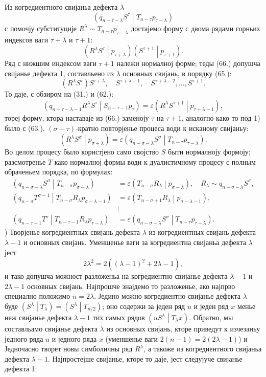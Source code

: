 ﻿\documentclass[11pt]{article}
\newcommand{\pair}[2]{\left(#1\middle|#2\right)}
\newcommand{\eps}{\varepsilon}
\begin{document}
Из когредиентного свијаньа дефекта $\lambda$
\[
 \pair{q_{n-\tau-\lambda}S^\tau}{T_{n-\tau}p_{\tau-\lambda}}
\]
с помочју субституције $R^\lambda\sim T_{n-\tau}p_{\tau-\lambda}$ достајемо форму с двома рядами горньих индексов ваги $\tau+\lambda$ и $\tau+1$:
\begin{equation}
 \pair{R^\lambda S^\tau}{p_{\tau+\lambda}}\pair{S^{\tau+1}}{p_{\tau+1}}.
\tag{66}
\end{equation}
Ряд с нижшим индексом ваги $\tau+1$ належи нормалној форме; теды (66.) допушча свијанье дефекта 1, составльено из $\lambda$ основных свијань, в порядку (65.):
\[
 (R^\lambda S^\tau)S^{\tau+\lambda},\quad S^{\tau+\lambda-1},\quad S^{\tau+\lambda-2},\ldots,S^{\tau+1}.
\]
То даје, с обзиром на (31.) и (62.):
\[
 \pair{q_{n-\tau-\lambda-1}R^\lambda S^\tau}{S_{n-\tau-1}p_\tau}
 =\eps\pair{R^\lambda S^{\tau+1}}{p_{\tau+\lambda+1}},
\]
тореј форму, ктора наставаје из (66.) заменоју $\tau$ на $\tau+1$, аналогно како то под 1) было с (63.). $(\sigma-\tau)$-кратно повторјенье процеса води к исканому свијаньу:
\[
 \pair{R^\lambda S^\sigma}{p_{\sigma+\lambda}}
 =\eps\pair{q_{n-\sigma-\lambda}S^\sigma}{T_{n-\tau}p_{\tau-\lambda}}.
\]
Во целом процесу было користјено само својство $S$ быти нормалноју формоју; разсмотренье $T$ како нормалној формы води к дуалистичному процесу с полным обраченьем порядка, по формулах:
\begin{align*}
\pair{q_{n-\sigma-\lambda}S^\sigma}{T_{n-\sigma}p_{\sigma-\lambda}}&=\eps\pair{T_{n-\sigma}R_\lambda}{p_{\sigma-\lambda}},\quad R_\lambda\sim q_{n-\sigma-\lambda}S^\sigma,\\
\pair{q_{n-\sigma}T^{\sigma-1}}{T_{n-\sigma}R_\lambda p_{\sigma-\lambda-1}}&=\eps\pair{T_{n-\sigma+1}R_\lambda}{p_{\sigma-\lambda-1}},\\
&\vdots\\
\pair{q_{n-\tau-1}T^\tau}{T_{n-\tau-1}R_\lambda p_{\tau-\lambda}}&=\eps\pair{q_{n-\sigma-\lambda}S^\sigma}{T_{n-\tau}p_{\tau-\lambda}}.
\end{align*}
) Творјенье когредиентных свијань дефекта $\lambda$ из когредиентных свијань дефекта $\lambda-1$ и основных свијань. Уменшенье ваги за когредиентна свијаньа дефекта $\lambda$ јест
\[
2\lambda^2=2((\lambda-1)^2+2\lambda-1),
\]
и тако допушча можност разложеньа на когредиентно свијанье дефекта $\lambda-1$ и $2\lambda-1$ основных свијань. Најпрошче знајдемо то разложенье, ако најпрво специално положимо $n=2\lambda$. Једино можно когредиентно свијанье дефекта $\lambda$ буде $\pair{S^\lambda}{T_\lambda}=\pair{S^\lambda}{T_{n/2}}$; оно содержи за једен ряд $u$ и једен ряд $x$ менье неж свијанье дефекта $\lambda-1$ тих самых рядов $\pair{uS^\lambda}{T_\lambda x}$. Обратно, мы составльамо свијанье дефекта $\lambda$ из основных свијань, кторе приведут к изчезаньу једного ряда $u$ и једного ряда $x$ (уменшенье ваги $2(n-1)=2(2\lambda-1)$) и Једночасно творет новы симболичны ряд $R^\lambda$, а такоже из когредиентного свијаньа дефекта $\lambda-1$. Најпростејше свијанье, кторе то даје, јест следујуче свијанье дефекта 1:
\end{document}
